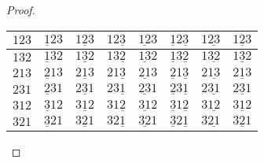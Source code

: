 \begin{theorem}
\begin{proof}
\begin{center}
\begin{tabular}{|l|l|l|l|l|l|l|l|}
\hline
\cellcolor{blue!30}$123$ & \cellcolor{orange2!40}$\underline{1}23$ & \cellcolor{brown!50}$1\underline{2}3$ & \cellcolor{red!25}$12\underline{3}$ & \cellcolor{brown!50}$\underline{12}3$ & \cellcolor{red!25}$\underline{1}2\underline{3}$ & \cellcolor{turq!40}$1\underline{23}$ & \cellcolor{turq!40}$\underline{123}$ \\
\hline
\cellcolor{blue!30}$132$ & \cellcolor{orange2!40}$\underline{1}32$ & \cellcolor{brown!50}$1\underline{3}2$ & \cellcolor{red!25}$13\underline{2}$ & \cellcolor{brown!50}$\underline{13}2$ & \cellcolor{red!25}$\underline{1}3\underline{2}$ & \cellcolor{ggreen!50}$1\underline{32}$ & \cellcolor{ggreen!50}$\underline{132}$ \\
\hline
\cellcolor{blue!30}$213$ & \cellcolor{yellow!50}$\underline{2}13$ & \cellcolor{brown!50}$2\underline{1}3$ & \cellcolor{turq!40}$21\underline{3}$ & \cellcolor{yellow!50}$\underline{21}3$ & \cellcolor{red!25}$\underline{2}1\underline{3}$ & \cellcolor{turq!40}$2\underline{13}$ & \cellcolor{red!25}$\underline{213}$ \\
\hline
\cellcolor{red!25}$231$ & \cellcolor{purple2!50}$\underline{2}31$ & \cellcolor{ggreen!50}$2\underline{3}1$ & \cellcolor{red!25}$23\underline{1}$ & \cellcolor{brown!50}$\underline{23}1$ & \cellcolor{purple2!50}$\underline{2}3\underline{1}$ & \cellcolor{ggreen!50}$2\underline{31}$ & \cellcolor{brown!50}$\underline{231}$ \\
\hline
\cellcolor{ggreen!50}$312$ & \cellcolor{yellow!50}$\underline{3}12$ & \cellcolor{ggreen!50}$3\underline{1}2$ &\cellcolor{turq!40}$31\underline{2}$ & \cellcolor{yellow!50}$\underline{31}2$ & \cellcolor{yellow!50}$\underline{3}1\underline{2}$ & \cellcolor{turq!40}$3\underline{12}$ & \cellcolor{yellow!50}$\underline{312}$ \\
\hline
\cellcolor{turq!40}$321$ & \cellcolor{yellow!50}$\underline{3}21$ & \cellcolor{ggreen!50}$3\underline{2}1$ & \cellcolor{turq!40}$32\underline{1}$ & \cellcolor{yellow!50}$\underline{32}1$ & \cellcolor{yellow!50}$\underline{3}2\underline{1}$ & \cellcolor{ggreen!50}$3\underline{21}$ & \cellcolor{yellow!50}$\underline{321}$\\
\hline
\end{tabular}
\end{center}


\end{proof}
\end{theorem}

